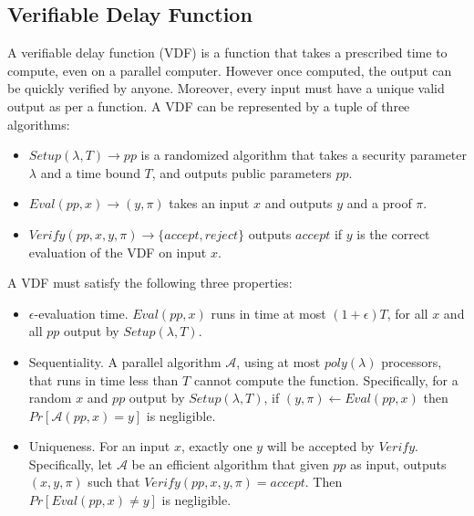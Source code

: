 \documentclass[11pt]{article}
\theoremstyle{definition}
\theoremstyle{remark}
\begin{document}

\subsection{Verifiable Delay Function}
A verifiable delay function (VDF) is a function that takes a prescribed time to compute, even on a parallel computer. However once computed, the output can be quickly verified by anyone. Moreover, every input must have a unique valid output as per a function. A VDF can be represented by a tuple of three algorithms:
\begin{itemize}
\item $Setup(\lambda, T) \rightarrow pp$ is a randomized algorithm that takes a security parameter $\lambda$ and a time bound $T$, and outputs public parameters $pp$.
\item $Eval(pp, x) \rightarrow (y, \pi)$ takes an input $x$ and outputs $y$ and a proof $\pi$.
\item $Verify(pp, x, y, \pi) \rightarrow \{accept, reject\}$ outputs $accept$ if $y$ is the correct evaluation of the VDF on input $x$.
\end{itemize}

A VDF must satisfy the following three properties:
\begin{itemize}
\item $\epsilon$-evaluation time. $Eval(pp, x)$ runs in time at most $(1 + \epsilon) T$, for all $x$ and all $pp$ output by $Setup(\lambda, T)$.
\item Sequentiality. A parallel algorithm $\mathcal{A}$, using at most $poly(\lambda)$ processors, that runs in time less than $T$ cannot compute the function. Specifically, for a random $x$ and $pp$ output by $Setup(\lambda, T)$, if $(y, \pi) \leftarrow Eval(pp, x)$ then $Pr[\mathcal{A}(pp, x) = y]$ is negligible.
\item Uniqueness. For an input $x$, exactly one $y$ will be accepted by $Verify$. Specifically, let $\mathcal{A}$ be an efficient algorithm that given $pp$ as input, outputs $(x, y, \pi)$ such that $Verify(pp, x, y, \pi) = accept$. Then $Pr[Eval(pp, x) \neq y]$ is negligible.
\end{itemize}
\end{document}

